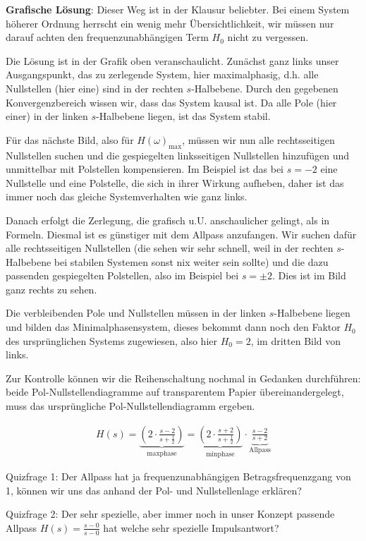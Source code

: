 \begin{ExCalc}
\textbf{Grafische Lösung}: Dieser Weg ist in der Klausur beliebter.
Bei einem System höherer Ordnung herrscht ein wenig mehr Übersichtlichkeit,
wir müssen nur darauf achten den frequenzunabhängigen Term $H_0$ nicht zu vergessen.

Die Lösung ist in der Grafik oben veranschaulicht. Zunächst ganz links unser
Ausgangspunkt, das zu zerlegende System, hier maximalphasig, d.h.
alle Nullstellen (hier eine) sind in der rechten $s$-Halbebene.
Durch den gegebenen Konvergenzbereich wissen wir, dass das System kausal ist.
Da alle Pole (hier einer) in der linken $s$-Halbebene liegen, ist das System
stabil.

Für das nächste Bild, also für $H(\omega)_\mathrm{max}$,
müssen wir nun alle rechtsseitigen Nullstellen
suchen und die gespiegelten linksseitigen Nullstellen hinzufügen und unmittelbar
mit Polstellen kompensieren.
Im Beispiel ist das bei $s=-2$ eine Nullstelle und eine Polstelle,
die sich in ihrer Wirkung aufheben, daher ist das immer noch das gleiche
Systemverhalten wie ganz links.

Danach erfolgt die Zerlegung, die grafisch u.U. anschaulicher gelingt, als in Formeln.
Diesmal ist es günstiger mit dem Allpass anzufangen.
Wir suchen dafür alle rechtsseitigen Nullstellen (die sehen wir sehr schnell, weil
in der rechten $s$-Halbebene bei stabilen Systemen sonst nix weiter sein sollte)
und die dazu passenden gespiegelten Polstellen, also im Beispiel bei $s=\pm 2$.
Dies ist im Bild ganz rechts zu sehen.

Die verbleibenden Pole und Nullstellen müssen in der linken $s$-Halbebene liegen und
bilden das Minimalphasensystem, dieses bekommt dann noch den Faktor $H_0$ des
ursprünglichen Systems zugewiesen, also hier $H_0=2$, im dritten Bild von links.

Zur Kontrolle können wir die Reihenschaltung nochmal in Gedanken durchführen:
beide Pol-Nullstellendiagramme auf transparentem Papier übereinandergelegt,
muss das ursprüngliche Pol-Nullstellendiagramm ergeben.

\end{ExCalc}


\begin{Loesung}
\begin{align}
H(s) =
\underbrace{\left(2\cdot\frac{s-2}{s+\frac{1}{2}}\right)}_{\mathrm{max phase}} =
\underbrace{\left(2\cdot\frac{s+2}{s+\frac{1}{2}}\right)}_{\mathrm{min phase}}
\cdot \underbrace{\frac{s-2}{s+2}}_{\mathrm{Allpass}}
\end{align}

Quizfrage 1: Der Allpass hat ja frequenzunabhängigen Betragsfrequenzgang von 1,
können wir uns das anhand der Pol- und Nullstellenlage erklären?

Quizfrage 2: Der sehr spezielle, aber immer noch in unser Konzept passende
Allpass $H(s) = \frac{s-0}{s-0}$ hat welche sehr spezielle Impulsantwort?
\end{Loesung}






